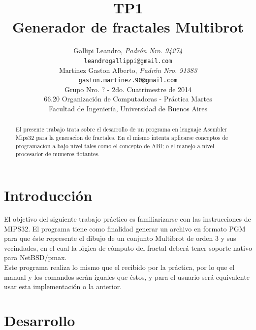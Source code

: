 \documentclass[10pt,spanish,a4paper,openany,notitlepage]{article}
\title{\textbf{TP1}\\ Generador de fractales Multibrot}
\author{Gallipi Leandro, \textit{Padrón Nro. 94274}                    \\
            \texttt{  leandrogallippi@gmail.com }                                              			\\
            Martinez Gaston Alberto, \textit{Padrón Nro. 91383}                     	\\
            \texttt{gaston.martinez.90@gmail.com}                                          			\\[2.5ex]
            \normalsize{Grupo Nro. ? - 2do. Cuatrimestre de 2014}                       	\\
            \normalsize{66.20 Organización de Computadoras - Práctica Martes}  	\\
            \normalsize{Facultad de Ingeniería, Universidad de Buenos Aires}     	\\
       }
\date{}
\begin{document}
\setcounter{page}{0} %

\maketitle

\thispagestyle{empty}

\begin{abstract}
El presente trabajo trata sobre el desarrollo de un programa en lenguaje Asembler Mips32 para la generacion de fractales. En el mismo intenta aplicarse conceptos de programacion a bajo nivel tales como el concepto de ABI; o el manejo a nivel procesador de numeros flotantes.
\end{abstract}
 
\newpage

\section{Introducción}

El objetivo del siguiente trabajo práctico es familiarizarse con las instrucciones de MIPS32.  El programa tiene como finalidad generar un archivo en formato PGM para que éste represente el dibujo de un conjunto Multibrot de orden 3 y sus vecindades, en el cual la lógica de cómputo del fractal deberá tener soporte nativo para NetBSD/pmax.\\
Este programa realiza lo mismo que el recibido por la práctica, por lo que el manual y los comandos serán iguales que éstos, y para el usuario será equivalente usar esta implementación o la anterior.

\section{Desarrollo}
\end{document}
